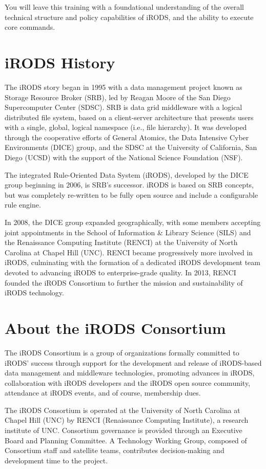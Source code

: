 \documentclass[10pt,oneside]{memoir}
\begin{document}
You will leave this training with a foundational understanding of the overall technical structure and policy capabilities of iRODS, and the ability to execute core commands.


\newpage
\section{iRODS History}

The iRODS story began in 1995 with a data management project known as Storage Resource Broker (SRB), led by Reagan Moore of the San Diego Supercomputer Center (SDSC). SRB is data grid middleware with a logical distributed file system, based on a client-server architecture that presents users with a single, global, logical namespace (i.e., file hierarchy). It was developed through the cooperative efforts of General Atomics, the Data Intensive Cyber Environments (DICE) group, and the SDSC at the University of California, San Diego (UCSD) with the support of the National Science Foundation (NSF).

The integrated Rule-Oriented Data System (iRODS), developed by the DICE group beginning in 2006, is SRB's successor. iRODS is based on SRB concepts, but was completely re-written to be fully open source and include a configurable rule engine.

In 2008, the DICE group expanded geographically, with some members accepting joint appointments in the School of Information \& Library Science (SILS) and the Renaissance Computing Institute (RENCI) at the University of North Carolina at Chapel Hill (UNC). RENCI became progressively more involved in iRODS, culminating with the formation of a dedicated iRODS development team devoted to advancing iRODS to enterprise-grade quality. In 2013, RENCI founded the iRODS Consortium to further the mission and sustainability of iRODS technology.

\section{About the iRODS Consortium}

The iRODS Consortium is a group of organizations formally committed to iRODS' success through support for the development and release of iRODS-based data management and middleware technologies, promoting advances in iRODS, collaboration with iRODS developers and the iRODS open source community, attendance at iRODS events, and of course, membership dues.

The iRODS Consortium is operated at the University of North Carolina at Chapel Hill (UNC) by RENCI (Renaissance Computing Institute), a research institute of UNC. Consortium governance is provided through an Executive Board and Planning Committee. A Technology Working Group, composed of Consortium staff and satellite teams, contributes decision-making and development time to the project.
\end{document}
